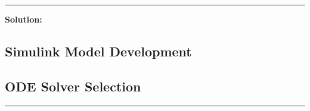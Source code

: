 \vspace{1em}
\noindent\rule{\textwidth}{0.4pt}
\vspace{1em}

\textbf{Solution:}

\subsection*{Simulink Model Development}


\subsection*{ODE Solver Selection}


\vspace{1em}
\noindent\rule{\textwidth}{0.4pt}
